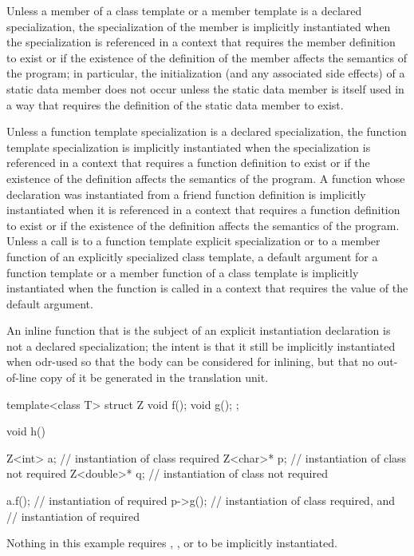 \pnum
Unless a member of a class template or a member template
is a declared specialization,
the specialization of the member is implicitly instantiated when the
specialization is referenced in a context that requires the member definition
to exist or
if the existence of the definition of the member
affects the semantics of the program;
in particular, the initialization (and any associated side effects) of a
static data member does not occur unless the static data member is itself used
in a way that requires the definition of the static data member to exist.

\pnum
Unless a function template specialization is a declared specialization,
the function template specialization is implicitly instantiated when the
specialization is referenced in a context that requires a function definition
to exist or
if the existence of the definition affects the semantics of the program.
A function whose declaration was instantiated from a friend function definition is
implicitly instantiated when it is referenced in a context that
requires a function definition to exist or
if the existence of the definition affects the semantics of the program.
Unless a call is to a function template explicit specialization or
to a member function of an explicitly specialized class template,
a default argument for a function template or a member function of a
class template is implicitly instantiated when the function is
called in a context that requires the value of the default argument.
\begin{note}
An inline function
that is the subject of an explicit instantiation declaration
is not a declared specialization;
the intent is that it still be implicitly instantiated
when odr-used
so that the body can be considered for inlining,
but that no out-of-line copy of it be generated in the translation unit.
\end{note}

\pnum
\begin{example}
\begin{codeblock}
template<class T> struct Z {
  void f();
  void g();
};

void h() {
  Z<int> a;         // instantiation of class  required
  Z<char>* p;       // instantiation of class  not required
  Z<double>* q;     // instantiation of class  not required

  a.f();            // instantiation of  required
  p->g();           // instantiation of class  required, and
                    // instantiation of  required
}
\end{codeblock}

Nothing in this example requires
,
,
or
to be implicitly instantiated.
\end{example}

